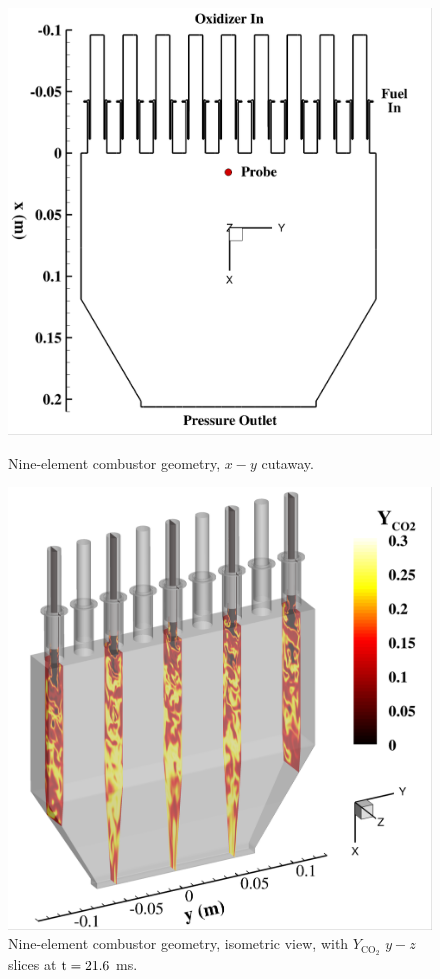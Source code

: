 \begin{figure}
	\begin{minipage}{0.49\linewidth}
		\includegraphics[width=0.99\linewidth,trim={0.5em 0.5em 0.5em 0.5em},clip]{Chapters/HPROMResults/Images/nineElem/geom_xy.png}
		\caption{\label{fig:nineElemGeomXY}Nine-element combustor geometry, $x-y$ cutaway.}
	\end{minipage}
	\begin{minipage}{0.49\linewidth}
		\includegraphics[width=0.99\linewidth,trim={0.5em 0.5em 0.5em 0.5em},clip]{Chapters/HPROMResults/Images/nineElem/geom_iso.png}
		\caption{\label{fig:nineElemGeomIso}Nine-element combustor geometry, isometric view, with $Y_{\text{CO}_2}$ $y-z$ slices at $\text{t} = 21.6$ ms.}
	\end{minipage}
\end{figure}

